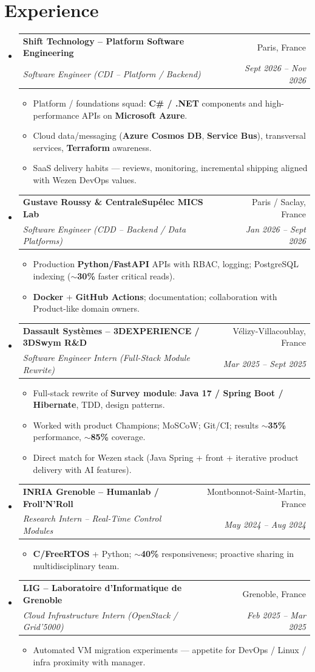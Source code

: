 \documentclass[letterpaper,10.5pt]{article}
\makeatletter
\newcommand{\resumeItem}[1]{\item\small{#1 \vspace{-1.5pt}}}
\newcommand{\resumeSubheading}[4]{\vspace{-1pt}\item\begin{tabular*}{0.97\textwidth}[t]{l@{\extracolsep{\fill}}r}\textbf{#1} & #2 \\\textit{\small#3} & \textit{\small #4} \\\end{tabular*}\vspace{-5pt}}
\newcommand{\resumeSubHeadingListStart}{\begin{itemize}[leftmargin=0.15in, label={}]}
\newcommand{\resumeSubHeadingListEnd}{\end{itemize}}
\newcommand{\resumeItemListStart}{\begin{itemize}[leftmargin=0.18in]}
\newcommand{\resumeItemListEnd}{\end{itemize}\vspace{-3pt}}
\makeatother
\begin{document}
\section{Experience}
\resumeSubHeadingListStart
  \resumeSubheading
    {Shift Technology -- Platform Software Engineering}{Paris, France}
    {Software Engineer (CDI -- Platform / Backend)}{Sept 2026 -- Nov 2026}
    \resumeItemListStart
      \resumeItem{Platform / foundations squad: \textbf{C\# / .NET} components and high-performance APIs on \textbf{Microsoft Azure}.}
      \resumeItem{Cloud data/messaging (\textbf{Azure Cosmos DB}, \textbf{Service Bus}), transversal services, \textbf{Terraform} awareness.}
      \resumeItem{SaaS delivery habits --- reviews, monitoring, incremental shipping aligned with Wezen DevOps values.}
    \resumeItemListEnd
  \resumeSubheading
    {Gustave Roussy \& CentraleSup\'elec MICS Lab}{Paris / Saclay, France}
    {Software Engineer (CDD -- Backend / Data Platforms)}{Jan 2026 -- Sept 2026}
    \resumeItemListStart
      \resumeItem{Production \textbf{Python/FastAPI} APIs with RBAC, logging; PostgreSQL indexing (\textbf{$\sim$30\%} faster critical reads).}
      \resumeItem{\textbf{Docker} + \textbf{GitHub Actions}; documentation; collaboration with Product-like domain owners.}
    \resumeItemListEnd
  \resumeSubheading
    {Dassault Syst\`emes -- 3DEXPERIENCE / 3DSwym R\&D}{V\'elizy-Villacoublay, France}
    {Software Engineer Intern (Full-Stack Module Rewrite)}{Mar 2025 -- Sept 2025}
    \resumeItemListStart
      \resumeItem{Full-stack rewrite of \textbf{Survey module}: \textbf{Java 17 / Spring Boot / Hibernate}, TDD, design patterns.}
      \resumeItem{Worked with product Champions; MoSCoW; Git/CI; results \textbf{$\sim$35\%} performance, \textbf{$\sim$85\%} coverage.}
      \resumeItem{Direct match for Wezen stack (Java Spring + front + iterative product delivery with AI features).}
    \resumeItemListEnd
  \resumeSubheading
    {INRIA Grenoble -- Humanlab / Froll'N'Roll}{Montbonnot-Saint-Martin, France}
    {Research Intern -- Real-Time Control Modules}{May 2024 -- Aug 2024}
    \resumeItemListStart
      \resumeItem{\textbf{C/FreeRTOS} + Python; \textbf{$\sim$40\%} responsiveness; proactive sharing in multidisciplinary team.}
    \resumeItemListEnd
  \resumeSubheading
    {LIG -- Laboratoire d'Informatique de Grenoble}{Grenoble, France}
    {Cloud Infrastructure Intern (OpenStack / Grid'5000)}{Feb 2025 -- Mar 2025}
    \resumeItemListStart
      \resumeItem{Automated VM migration experiments --- appetite for DevOps / Linux / infra proximity with manager.}
    \resumeItemListEnd
\resumeSubHeadingListEnd
\end{document}
